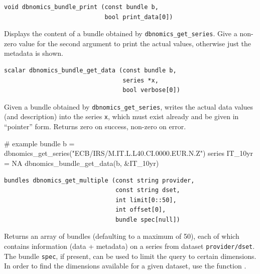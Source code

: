 \documentclass{article}
\begin{document}
\begin{funcdoc}
\begin{verbatim}
void dbnomics_bundle_print (const bundle b,
                            bool print_data[0])
\end{verbatim}
Displays the content of a bundle obtained by
\texttt{dbnomics\_get\_series}. Give a non-zero value for the second
argument to print the actual values, otherwise just the metadata is
shown.
\end{funcdoc}

\begin{funcdoc}
\begin{verbatim}
scalar dbnomics_bundle_get_data (const bundle b,
                                 series *x,
                                 bool verbose[0])
\end{verbatim}
Given a bundle obtained by \texttt{dbnomics\_get\_series}, writes the
actual data values (and description) into the series \texttt{x}, which
must exist already and be given in ``pointer'' form. Returns zero on
success, non-zero on error.
\begin{code}
# example
bundle b = dbnomics_get_series("ECB/IRS/M.IT.L.L40.CI.0000.EUR.N.Z")
series IT_10yr = NA
dbnomics_bundle_get_data(b, &IT_10yr)
\end{code}
\end{funcdoc}

\begin{funcdoc}
\begin{verbatim}
bundles dbnomics_get_multiple (const string provider,
                               const string dset,
                               int limit[0::50],
                               int offset[0],
                               bundle spec[null])
\end{verbatim}
  Returns an array of bundles (defaulting to a maximum of 50), each of
  which contains information (data + metadata) on a series from
  dataset \texttt{provider/dset}. The bundle \texttt{spec}, if
  present, can be used to limit the query to certain dimensions. In
  order to find the dimensions available for a given dataset, use the
  function .
\end{funcdoc}
\end{document}
